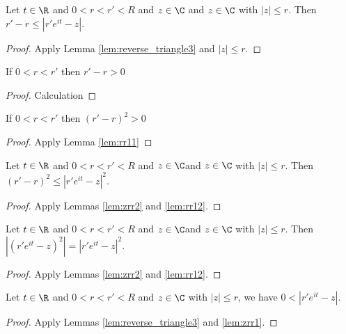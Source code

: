 
\begin{lemma} \label{lem:zrr2} \leanok
Let $t\in\R$ and $0 < r < r' < R$ and $z\in\C$ and $z\in\C$ with $|z|\le r$. Then $r' - r \le |r'e^{it}-z|$.
\end{lemma}
\begin{proof}\leanok
{}
Apply Lemma \ref{lem:reverse_triangle3} and $|z|\le r$.
\end{proof}


\begin{lemma} \label{lem:rr11} \leanok
If $0<r<r'$ then $r'-r>0$
\end{lemma}
\begin{proof}\leanok
Calculation
\end{proof}


\begin{lemma} \label{lem:rr12} \leanok
If $0<r<r'$ then $(r'-r)^2>0$
\end{lemma}
\begin{proof}\leanok
{}
Apply Lemma \ref{lem:rr11}
\end{proof}


\begin{lemma} \label{lem:zrr3} \leanok
Let $t\in\R$ and $0 < r < r' < R$ and $z\in\C$and $z\in\C$ with $|z|\le r$. Then $(r' - r)^2 \le |r'e^{it}-z|^2$.
\end{lemma}
\begin{proof}\leanok
{}
Apply Lemmas \ref{lem:zrr2} and \ref{lem:rr12}.
\end{proof}


\begin{lemma} \label{lem:zrr4} \leanok
Let $t\in\R$ and $0 < r < r' < R$ and $z\in\C$and $z\in\C$ with $|z|\le r$. Then $|(r'e^{it}-z)^2| = |r'e^{it}-z|^2$.
\end{lemma}
\begin{proof}\leanok
{}
Apply Lemmas \ref{lem:zrr2} and \ref{lem:rr12}.
\end{proof}


\begin{lemma} \label{lem:reverse_triangle4} \leanok
Let $t\in\R$ and $0 < r < r' < R$ and $z\in\C$ with $|z|\le r$, we have $0 < |r'e^{it}-z|$.
\end{lemma}
\begin{proof}\leanok
{}
Apply Lemmas \ref{lem:reverse_triangle3} and \ref{lem:zrr1}.
\end{proof}

